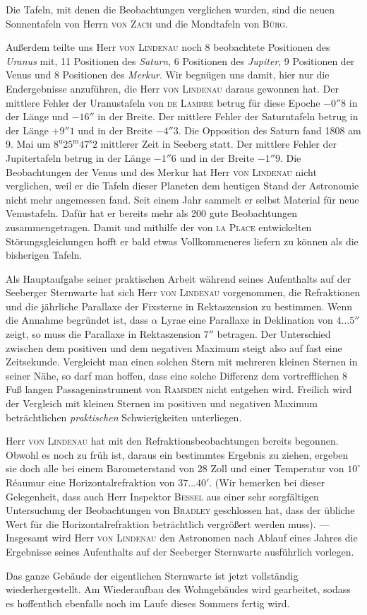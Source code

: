 Die Tafeln, mit denen die Beobachtungen verglichen wurden, sind die neuen Sonnentafeln von Herrn \textsc{von Zach} und die Mondtafeln von \textsc{Bürg}.

Außerdem teilte uns Herr \textsc{von Lindenau} noch 8 beobachtete Positionen des \emph{Uranus} mit, 11 Positionen des \emph{Saturn}, 6 Positionen des \emph{Jupiter}, 9 Positionen der Venus und 8 Positionen des \emph{Merkur}. Wir begnügen uns damit, hier nur die Endergebnisse anzuführen, die Herr \textsc{von Lindenau} daraus gewonnen hat. Der mittlere Fehler der Uranustafeln von \textsc{de Lambre} betrug für diese Epoche $-0''8$ in der Länge und $-16''$ in der Breite. Der mittlere Fehler der Saturntafeln betrug in der Länge $+9''1$ und in der Breite $-4''3$. Die Opposition des Saturn fand 1808 am 9. Mai um $8^{\mathrm{u}}25^{\mathrm{m}}47^{\mathrm{s}}2$ mittlerer Zeit in Seeberg statt. Der mittlere Fehler der Jupitertafeln betrug in der Länge $-1''6$ und in der Breite $-1''9$. Die Beobachtungen der Venus und des Merkur hat Herr \textsc{von Lindenau} nicht verglichen, weil er die Tafeln dieser Planeten dem heutigen Stand der Astronomie nicht mehr angemessen fand. Seit einem Jahr sammelt er selbst Material für neue Venustafeln. Dafür hat er bereits mehr als 200 gute Beobachtungen zusammengetragen. Damit und mithilfe der von \textsc{la Place} entwickelten Störungsgleichungen hofft er bald etwas Vollkommeneres liefern zu können als die bisherigen Tafeln.

Als Hauptaufgabe seiner praktischen Arbeit während seines Aufenthalts auf der Seeberger Sternwarte hat sich Herr \textsc{von Lindenau} vorgenommen, die Refraktionen und die jährliche Parallaxe der Fixsterne in Rektaszension zu bestimmen. Wenn die Annahme begründet ist, dass $\alpha$ Lyrae eine Parallaxe in Deklination von $4\ldots5''$ zeigt, so muss die Parallaxe in Rektaszension $7''$ betragen. Der Unterschied zwischen dem positiven und dem negativen Maximum steigt also auf fast eine Zeitsekunde. Vergleicht man einen solchen Stern mit mehreren kleinen Sternen in seiner Nähe, so darf man hoffen, dass eine solche Differenz dem vortrefflichen 8 Fuß langen Passageninstrument von \textsc{Ramsden} nicht entgehen wird. Freilich wird der Vergleich mit kleinen Sternen im positiven und negativen Maximum beträchtlichen \emph{praktischen} Schwierigkeiten unterliegen.

Herr \textsc{von Lindenau} hat mit den Refraktionsbeobachtungen bereits begonnen. Obwohl es noch zu früh ist, daraus ein bestimmtes Ergebnis zu ziehen, ergeben sie doch alle bei einem Barometerstand von 28 Zoll und einer Temperatur von $10^{\circ}$ Réaumur eine Horizontalrefraktion von $37\ldots40'$. (Wir bemerken bei dieser Gelegenheit, dass auch Herr Inspektor \textsc{Bessel} aus einer sehr sorgfältigen Untersuchung der Beobachtungen von \textsc{Bradley} geschlossen hat, dass der übliche Wert für die Horizontalrefraktion beträchtlich vergrößert werden muss). — Insgesamt wird Herr \textsc{von Lindenau} den Astronomen nach Ablauf eines Jahres die Ergebnisse seines Aufenthalts auf der Seeberger Sternwarte ausführlich vorlegen.

Das ganze Gebäude der eigentlichen Sternwarte ist jetzt vollständig wiederhergestellt. Am Wiederaufbau des Wohngebäudes wird gearbeitet, sodass es hoffentlich ebenfalls noch im Laufe dieses Sommers fertig wird.
